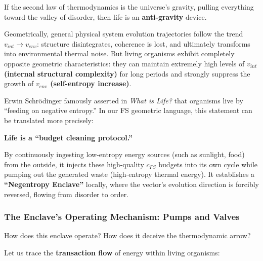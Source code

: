 If the second law of thermodynamics is the universe's gravity, pulling everything toward the valley of disorder, then life is an \textbf{anti-gravity} device.

Geometrically, general physical system evolution trajectories follow the trend $v_{int} \to v_{env}$: structure disintegrates, coherence is lost, and ultimately transforms into environmental thermal noise. But living organisms exhibit completely opposite geometric characteristics: they can maintain extremely high levels of \textbf{$v_{int}$ (internal structural complexity)} for long periods and strongly suppress the growth of \textbf{$v_{env}$ (self-entropy increase)}.

Erwin Schrödinger famously asserted in \textit{What is Life?} that organisms live by ``feeding on negative entropy.'' In our FS geometric language, this statement can be translated more precisely:

\textbf{Life is a ``budget cleaning protocol.''}

By continuously ingesting low-entropy energy sources (such as sunlight, food) from the outside, it injects these high-quality $c_{FS}$ budgets into its own cycle while pumping out the generated waste (high-entropy thermal energy). It establishes a \textbf{``Negentropy Enclave''} locally, where the vector's evolution direction is forcibly reversed, flowing from disorder to order.

\subsubsection{The Enclave's Operating Mechanism: Pumps and Valves}

How does this enclave operate? How does it deceive the thermodynamic arrow?

Let us trace the \textbf{transaction flow} of energy within living organisms:

